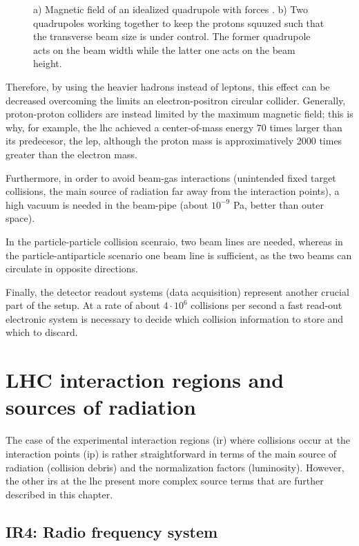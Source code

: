 \documentclass[encoding=utf8,british]{tumphthesis}
\begin{document}
\begin{figure}[H]
    \caption{a) Magnetic field of an idealized quadrupole with forces \cite{quadrupole-magnetic-field}. b) Two quadrupoles working together to keep the protons squuzed such that the transverse beam size is under control. The former quadrupole acts on the beam width while the latter one acts on the beam height. \cite{two-quadrupoles}
    }
    \label{fig:quadrupole-magnetic-field}
\end{figure}


Therefore, by using the heavier hadrons instead of leptons, this effect can be decreased overcoming the limits an electron-positron circular collider. Generally, proton-proton colliders are instead limited by the maximum magnetic field; this is why, for example, the \acrshort{lhc} achieved a center-of-mass energy 70 times larger than its predecesor, the \acrshort{lep}, although the proton mass is approximatively 2000 times greater than the electron mass.

Furthermore, in order to avoid beam-gas interactions (unintended fixed target collisions, the main source of radiation far away from the interaction points), a high vacuum is needed in the beam-pipe (about $10^{-9}$ Pa, better than outer space). 

In the particle-particle collision scenraio, two beam lines are needed, whereas in the particle-antiparticle scenario one beam line is sufficient, as the two beams can circulate in opposite directions. 

Finally, the detector readout systems (data acquisition) represent another crucial part of the setup. At a rate of about $4 \cdot 10^6$ collisions per second a fast read-out electronic system is necessary to decide which collision information to store and which to discard.


\chapter{LHC interaction regions and sources of radiation}
\label{appendix:IR-beam-intensity}

The case of the experimental interaction regions (\acrshort{ir}) where collisions occur at the interaction points (\acrshort{ip}) is rather straightforward in terms of the main source of radiation (collision debris) and the normalization factors (luminosity). However, the other \acrshort{ir}s at the \acrshort{lhc} present more complex source terms that are further described in this chapter.

\section{IR4: Radio frequency system}
\end{document}

